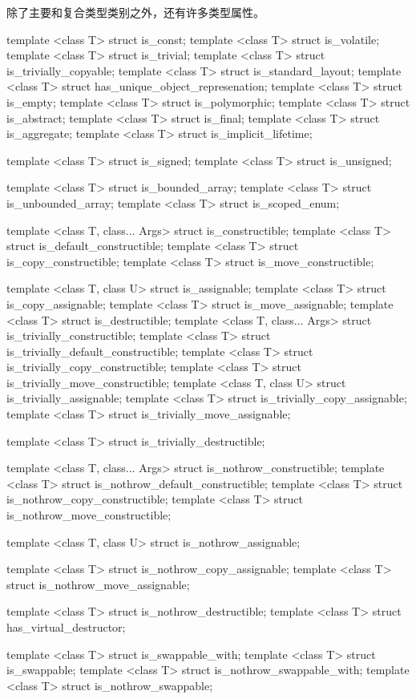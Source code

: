 
除了主要和复合类型类别之外，还有许多类型属性。

\begin{cpp}
template <class T> struct is_const;
template <class T> struct is_volatile;
template <class T> struct is_trivial;
template <class T> struct is_trivially_copyable;
template <class T> struct is_standard_layout;
template <class T> struct has_unique_object_represenation;
template <class T> struct is_empty;
template <class T> struct is_polymorphic;
template <class T> struct is_abstract;
template <class T> struct is_final;
template <class T> struct is_aggregate;
template <class T> struct is_implicit_lifetime;

template <class T> struct is_signed;
template <class T> struct is_unsigned;

template <class T> struct is_bounded_array;
template <class T> struct is_unbounded_array;
template <class T> struct is_scoped_enum;

template <class T, class... Args> struct is_constructible;
template <class T> struct is_default_constructible;
template <class T> struct is_copy_constructible;
template <class T> struct is_move_constructible;

template <class T, class U> struct is_assignable;
template <class T> struct is_copy_assignable;
template <class T> struct is_move_assignable;
template <class T> struct is_destructible;
template <class T, class... Args> struct is_trivially_constructible;
template <class T> struct is_trivially_default_constructible;
template <class T> struct is_trivially_copy_constructible;
template <class T> struct is_trivially_move_constructible;
template <class T, class U> struct is_trivially_assignable;
template <class T> struct is_trivially_copy_assignable;
template <class T> struct is_trivially_move_assignable;

template <class T> struct is_trivially_destructible;

template <class T, class... Args> struct is_nothrow_constructible;
template <class T> struct is_nothrow_default_constructible;
template <class T> struct is_nothrow_copy_constructible;
template <class T> struct is_nothrow_move_constructible;

template <class T, class U> struct is_nothrow_assignable;

template <class T> struct is_nothrow_copy_assignable;
template <class T> struct is_nothrow_move_assignable;

template <class T> struct is_nothrow_destructible;
template <class T> struct has_virtual_destructor;

template <class T> struct is_swappable_with;
template <class T> struct is_swappable;
template <class T> struct is_nothrow_swappable_with;
template <class T> struct is_nothrow_swappable;
\end{cpp}

